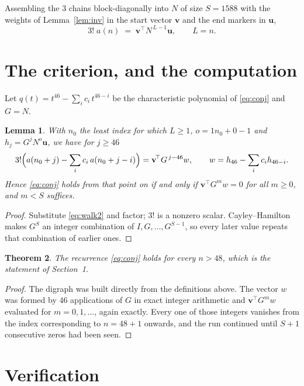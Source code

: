 \documentclass[11pt,a4paper]{article}
\theoremstyle{plain}
\newtheorem{theorem}{Theorem}
\newtheorem{lemma}[theorem]{Lemma}
\theoremstyle{definition}
\begin{document}
Assembling the $3$ chains block-diagonally into $N$ of size $S=1588$ with the weights of
Lemma~\ref{lem:inv} in the start vector $\mathbf{v}$ and the end markers in
$\mathbf{u}$,
\begin{equation}\label{eq:walk2}
3!\;a(n)\;=\;\mathbf{v}^{\!\top}N^{\,L-1}\mathbf{u},\qquad L=n .
\end{equation}

\section{The criterion, and the computation}

Let $q(t)=t^{46}-\sum_i c_i\,t^{46-i}$ be the characteristic polynomial of
\eqref{eq:conj} and $G=N$.

\begin{lemma}\label{lem:crit}
With $n_0$ the least index for which $L\ge1$, $o=1n_0+0-1$ and
$h_j=G^{j}N^{o}\mathbf{u}$, we have for $j\ge46$
\[
3!\Bigl(a(n_0+j)-\sum_i c_i\,a(n_0+j-i)\Bigr)=\mathbf{v}^{\!\top}G^{\,j-46}w,
\qquad w=h_{46}-\sum_i c_ih_{46-i} .
\]
Hence \eqref{eq:conj} holds from that point on if and only if
$\mathbf{v}^{\!\top}G^{m}w=0$ for all $m\ge0$, and $m<S$ suffices.
\end{lemma}

\begin{proof}
Substitute \eqref{eq:walk2} and factor; $3!$ is a nonzero scalar. Cayley--Hamilton
makes $G^{S}$ an integer combination of $I,G,\dots,G^{S-1}$, so every later value repeats
that combination of earlier ones.
\end{proof}

\begin{theorem}
The recurrence \eqref{eq:conj} holds for every $n>48$, which is the statement of
Section~1.
\end{theorem}

\begin{proof}
The digraph was built directly from the definitions above. The vector $w$ was formed by
$46$ applications of $G$ in exact integer arithmetic and $\mathbf{v}^{\!\top}G^{m}w$
evaluated for $m=0,1,\dots$, again exactly. Every one of those integers vanishes from the
index corresponding to $n=48+1$ onwards, and the run continued until $S+1$ consecutive
zeros had been seen.
\end{proof}

\section{Verification}
\end{document}
